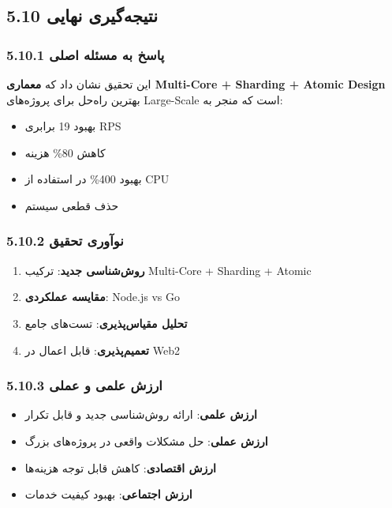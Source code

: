 \documentclass[
]{article}
\providecommand{\tightlist}{%
  \setlength{\itemsep}{0pt}\setlength{\parskip}{0pt}}
\begin{document}
\subsection{5.10 نتیجه‌گیری
نهایی}\label{ux646ux62aux6ccux62cux647ux6afux6ccux631ux6cc-ux646ux647ux627ux6ccux6cc}

\subsubsection{5.10.1 پاسخ به مسئله
اصلی}\label{ux67eux627ux633ux62e-ux628ux647-ux645ux633ux626ux644ux647-ux627ux635ux644ux6cc}

این تحقیق نشان داد که \textbf{معماری Multi-Core + Sharding + Atomic
Design} بهترین راه‌حل برای پروژه‌های Large-Scale است که منجر به:

\begin{itemize}
\tightlist
\item
  بهبود 19 برابری RPS
\item
  کاهش 80\% هزینه
\item
  بهبود 400\% در استفاده از CPU
\item
  حذف قطعی سیستم
\end{itemize}

\subsubsection{5.10.2 نوآوری
تحقیق}\label{ux646ux648ux622ux648ux631ux6cc-ux62aux62dux642ux6ccux642}

\begin{enumerate}
\def\labelenumi{\arabic{enumi}.}
\tightlist
\item
  \textbf{روش‌شناسی جدید}: ترکیب Multi-Core + Sharding + Atomic
\item
  \textbf{مقایسه عملکردی}: Node.js vs Go
\item
  \textbf{تحلیل مقیاس‌پذیری}: تست‌های جامع
\item
  \textbf{تعمیم‌پذیری}: قابل اعمال در Web2
\end{enumerate}

\subsubsection{5.10.3 ارزش علمی و
عملی}\label{ux627ux631ux632ux634-ux639ux644ux645ux6cc-ux648-ux639ux645ux644ux6cc}

\begin{itemize}
\tightlist
\item
  \textbf{ارزش علمی}: ارائه روش‌شناسی جدید و قابل تکرار
\item
  \textbf{ارزش عملی}: حل مشکلات واقعی در پروژه‌های بزرگ
\item
  \textbf{ارزش اقتصادی}: کاهش قابل توجه هزینه‌ها
\item
  \textbf{ارزش اجتماعی}: بهبود کیفیت خدمات
\end{itemize}
\end{document}
